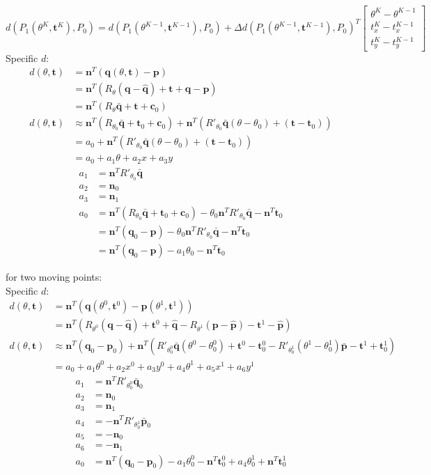 \documentclass[12pt]{amsart}
\newcommand{\bt}{\mathbf{t}}
\newcommand{\bn}{\mathbf{n}}
\newcommand{\bq}{\mathbf{q}}
\newcommand{\bp}{\mathbf{p}}
\newcommand{\bc}{\mathbf{c}}
\newcommand{\tq}{\mathbf{\hat{q}}}
\newcommand{\tp}{\mathbf{\hat{p}}}
\newcommand{\barq}{\mathbf{\bar{q}}}
\newcommand{\barp}{\mathbf{\bar{p}}}
\begin{document}
\begin{equation}
	d(P_1(\theta^K, \bt^K),P_0) = d(P_1(\theta^{K-1}, \bt^{K-1}),P_0) +  \Delta d(P_1(\theta^{K-1}, \bt^{K-1}),P_0)^T \begin{bmatrix}
		\theta^K - \theta^{K-1}\\
		t_x^K - t_x^{K-1} \\
		t_y^K - t_y^{K-1}
		\end{bmatrix}
	\end{equation}
Specific $d$:
\begin{align}
	d(\theta, \bt)& = \bn^T(\bq(\theta, \bt) - \bp)\\
			   &= \bn^T(R_\theta(\bq -\tq)+\bt +\tq - \bp)\\
			   &= \bn^T(R_\theta\barq+\bt +\bc_0)\\
	d(\theta, \bt) &\approx \bn^T(R_{\theta_0}\barq+\bt_0 +\bc_0) +\bn^T(R'_{\theta_0} \barq (\theta - \theta_0)+(\bt - \bt_0)) \\
			   &= a_0 + \bn^T(R'_{\theta_0} \barq (\theta - \theta_0)+(\bt - \bt_0)) \\
			   &= a_0 + a_1\theta + a_2x + a_3 y
\end{align}
\begin{align}
				a_1 &= \bn^TR'_{\theta_0} \barq \\
				a_2 &= \bn_0 \\
				a_3 &= \bn_1 \\
				a_0 &=  \bn^T(R_{\theta_0}\barq+\bt_0 +\bc_0) -\theta_0\bn^TR'_{\theta_0} \barq - \bn^T\bt_0 \\
				       &= \bn^T(\bq_0 - \bp) - \theta_0\bn^TR'_{\theta_0} \barq - \bn^T\bt_0 \\
				       &= \bn^T(\bq_0 - \bp) - a_1\theta_0 - \bn^T\bt_0
\end{align}

for two moving points:
\\Specific $d$:
\begin{align}
	d(\theta, \bt)& = \bn^T(\bq(\theta^0, \bt^0) - \bp(\theta^1, \bt^1))\\
			   &= \bn^T(R_{\theta^0}(\bq -\tq)+\bt^0 +\tq - R_{\theta^1}(\bp -\tp) - \bt^1 - \tp)\\
	d(\theta, \bt) &\approx \bn^T(\bq_0 - \bp_0) +  \bn^T(R'_{\theta^0_0} \barq(\theta^0 - \theta^0_0) + \bt^0 - \bt^0_0 - R'_{\theta^1_0}(\theta^1 - \theta^1_0) \barp - \bt^1 + \bt^1_0) \\
			   &= a_0 + a_1\theta^0 + a_2x^0 + a_3 y^0 + a_4\theta^1 + a_5x^1 + a_6 y^1
\end{align}
\begin{align}
				a_1 &= \bn^TR'_{\theta^0_0} \barq_0 \\
				a_2 &= \bn_0 \\
				a_3 &= \bn_1 \\
				a_4 &= -\bn^TR'_{\theta^1_0} \barp_0 \\
				a_5 &= -\bn_0 \\
				a_6 &= -\bn_1 \\
				a_0 &=  \bn^T(\bq_0 - \bp_0) - a_1\theta^0_0 - \bn^T \bt^0_0 + a_4 \theta^1_0 + \bn^T \bt^1_0 
\end{align}
\end{document}
